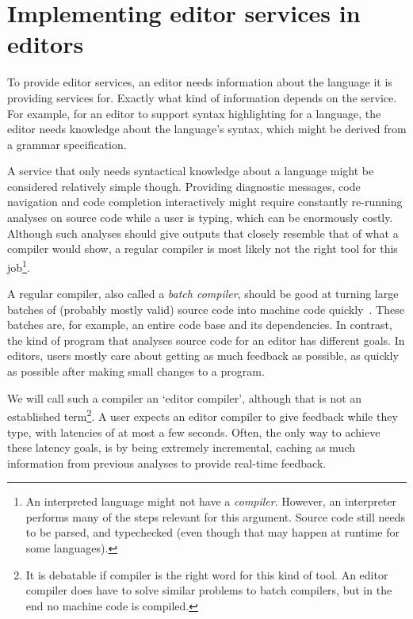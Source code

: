 \section{Implementing editor services in editors}\label{sec:implementing-editor-services-in-editors}

To provide editor services, an editor needs information about the language it is providing services for.
Exactly what kind of information depends on the service.
For example, for an editor to support syntax highlighting for a language, the editor needs knowledge about the language's syntax, which might be derived from a grammar specification.

A service that only needs syntactical knowledge about a language might be considered relatively simple though.
Providing diagnostic messages, code navigation and code completion interactively might require constantly re-running analyses on source code while a user is typing, which can be enormously costly.
Although such analyses should give outputs that closely resemble that of what a compiler would show, a regular compiler is most likely not the right tool for this job\footnote{An interpreted language might not have a \emph{compiler}. However, an interpreter performs many of the steps relevant for this argument. Source code still needs to be parsed, and typechecked (even though that may happen at runtime for some languages).}.

A regular compiler, also called a \emph{batch compiler}, should be good at turning large batches of (probably mostly valid) source code into machine code quickly~\autocite{Katzan69mod, matkladlsp}.
These batches are, for example, an entire code base and its dependencies.
In contrast, the kind of program that analyses source code for an editor has different goals.
In editors, users mostly care about getting as much feedback as possible, as quickly as possible after making small changes to a program.

We will call such a compiler an `editor compiler', although that is not an established term\footnote{It is debatable if compiler is the right word for this kind of tool. An editor compiler does have to solve similar problems to batch compilers, but in the end no machine code is compiled.}.
A user expects an editor compiler to give feedback while they type, with latencies of at most a few seconds.
Often, the only way to achieve these latency goals, is by being extremely incremental, caching as much information from previous analyses to provide real-time feedback.

